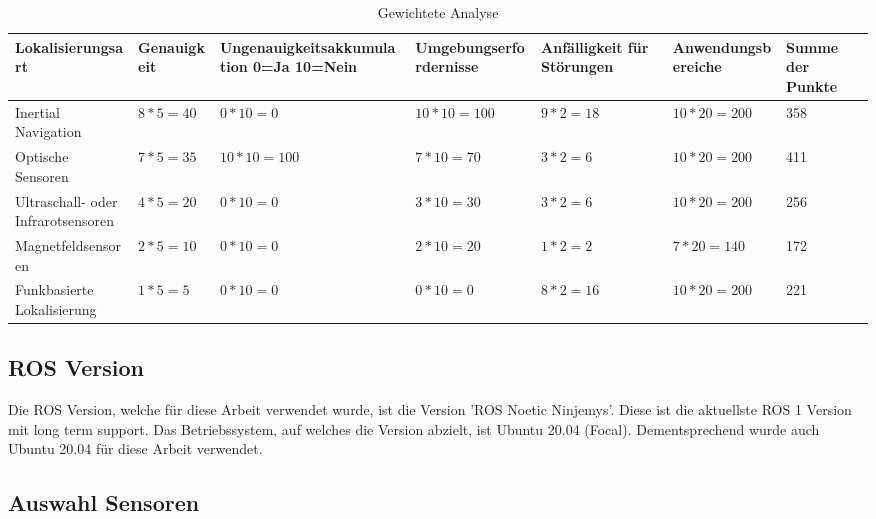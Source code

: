 \begin{table}[H]
    \fontsize{6}{11}\selectfont
    \begin{center}
        \begin{tabular}{|p{2cm}|p{1.3cm}|p{2cm}|p{1.5cm}|p{2cm}|p{2cm}|p{1.5cm}|}
            \hline
            \textbf{Lokalisier\-ungsart} & \textbf{Genauig\-keit} & \textbf{Ungenauigkeits\-akkumulation 0=Ja 10=Nein} & \textbf{Umgebungs\-erfordernisse} & \textbf{Anfälligkeit für Störungen} & \textbf{Anwendungs\-bereiche} & \textbf{Summe der Punkte} \\\hline
            \rowcolor{green}
            Inertial Navigation & $8*5=40$ & $0*10=0$ & $10*10=100$ & $9*2=18$ & $10*20=200$ & 358 \\\hline
            \rowcolor{green}
            Optische Sensoren & $7*5=35$ & $10*10=100$ & $7*10=70$ & $3*2=6$ & $10*20=200$& 411 \\\hline
            Ultraschall- oder Infrarotsensoren & $4*5=20$ & $0*10=0$ & $3*10=30$ & $3*2=6$ & $10*20=200$& 256 \\\hline
            Magnetfeldsensoren & $2*5=10$ & $0*10=0$ & $2*10=20$ & $1*2=2$ & $7*20=140$ & 172 \\\hline
            Funkbasierte Lokalisierung & $1*5=5$ & $0*10=0$ & $0*10=0$ & $8*2=16$ & $10*20=200$ & 221 \\\hline
        \end{tabular}
        \caption{Gewichtete Analyse}\label{tab:vergleich-gewichtung}
    \end{center}
\end{table}


\subsection{ROS Version}

Die \ac{ROS} Version, welche für diese Arbeit verwendet wurde, ist die Version 'ROS Noetic Ninjemys'. Diese ist die aktuellste ROS 1 Version mit long term support. Das Betriebssystem, auf welches die Version abzielt, ist Ubuntu 20.04 (Focal). Dementsprechend wurde auch Ubuntu 20.04 für diese Arbeit verwendet.

\subsection{Auswahl Sensoren}

